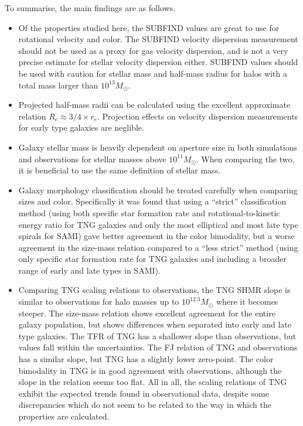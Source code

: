 To summarise, the main findings are as follows.
\begin{itemize}
	\item Of the properties studied here, the SUBFIND values are great to use for rotational velocity and color. The SUBFIND velocity dispersion measurement should not be used as a proxy for gas velocity dispersion, and is not a very precise estimate for stellar velocity dispersion either. SUBFIND values should be used with caution for stellar mass and half-mass radius for halos with a total mass larger than $10^{13} M_\odot$.
	\item Projected half-mass radii can be calculated using the excellent approximate relation $R_{e} \approx 3/4 \times r_{e}$. Projection effects on velocity dispersion measurements for early type galaxies are neglible.
	\item Galaxy stellar mass is heavily dependent on aperture size in both simulations and observations for stellar masses above $10^{11} M_\odot$. When comparing the two, it is beneficial to use the same definition of stellar mass.
	\item Galaxy morphology classification should be treated carefully when comparing sizes and color. Specifically it was found that using a ``strict'' classification method (using both specific star formation rate and rotational-to-kinetic energy ratio for TNG galaxies and only the most elliptical and most late type spirals for SAMI) gave better agreement in the color bimodality, but a worse agreement in the size-mass relation compared to a ``less strict'' method (using only specific star formation rate for TNG galaxies and including a broader range of early and late types in SAMI).
	\item Comparing TNG scaling relations to observations, the TNG SHMR slope is similar to observations for halo masses up to $10^{12.3} M_\odot$ where it becomes steeper. The size-mass relation shows excellent agreement for the entire galaxy population, but shows differences when separated into early and late type galaxies. The TFR of TNG has a shallower slope than observations, but values fall within the uncertainties. The FJ relation of TNG and observations has a similar slope, but TNG has a slightly lower zero-point. The color bimodality in TNG is in good agreement with observations, although the slope in the relation seems too flat. All in all, the scaling relations of TNG exhibit the expected trends found in observational data, despite some discrepancies which do not seem to be related to the way in which the properties are calculated.
	

\end{itemize}

